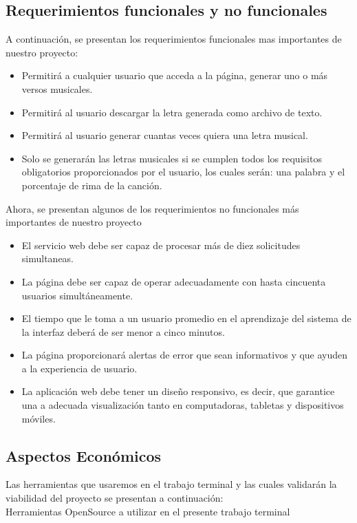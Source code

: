 \documentclass[12pt, a4paper, titlepage]{report}
\begin{document}
		\subsection{Requerimientos funcionales y no funcionales}
		A continuación, se presentan los requerimientos funcionales mas importantes de nuestro proyecto:
		\begin{itemize}
			\item Permitirá a cualquier usuario que acceda a la página, generar uno o más versos musicales.
			\item Permitirá al usuario descargar la letra generada como archivo de texto.
			\item Permitirá al usuario generar cuantas veces quiera una letra musical.
			\item Solo se generarán las letras musicales si se cumplen todos los requisitos obligatorios proporcionados por el usuario, los cuales serán: una palabra y el porcentaje de rima de la canción.
		\end{itemize}
		Ahora, se presentan algunos de los requerimientos no funcionales más importantes de nuestro proyecto
		\begin{itemize}
			\item El servicio web debe ser capaz de procesar más de diez solicitudes simultaneas.
			\item La página debe ser capaz de operar adecuadamente con hasta cincuenta usuarios simultáneamente.
			\item El tiempo que le toma a un usuario promedio en el aprendizaje del sistema de la interfaz deberá de ser menor a cinco minutos.
			\item La página proporcionará alertas de error que sean informativos y que ayuden a la experiencia de usuario.
			\item La aplicación web debe tener un diseño responsivo, es decir, que garantice una a adecuada visualización tanto en computadoras, tabletas y dispositivos móviles.
		\end{itemize}
	\newpage
		\subsection{Aspectos Econ\'omicos}
		Las herramientas que usaremos en el trabajo terminal y las cuales validarán la viabilidad del proyecto se presentan a continuación:\\
		
		Herramientas OpenSource a utilizar en el presente trabajo terminal
		
\end{document}
